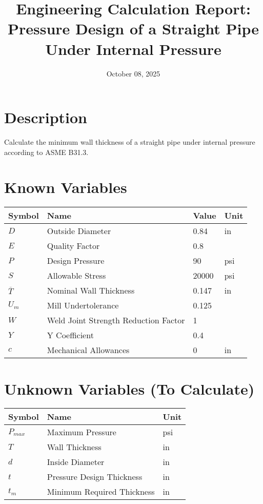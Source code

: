 \documentclass[11pt,a4paper]{article}
\title{Engineering Calculation Report: Pressure Design of a Straight Pipe Under Internal Pressure}
\date{October 08, 2025}
\begin{document}
\maketitle

\section*{Description}
Calculate the minimum wall thickness of a straight pipe under internal pressure according to ASME B31.3.

\section{Known Variables}

\begin{longtable}{llll}
\toprule
Symbol & Name & Value & Unit \\
\midrule
\endhead
$D$ & Outside Diameter & 0.84 & in \\
$E$ & Quality Factor & 0.8 &  \\
$P$ & Design Pressure & 90 & psi \\
$S$ & Allowable Stress & 20000 & psi \\
$\overline{T}$ & Nominal Wall Thickness & 0.147 & in \\
$U_{m}$ & Mill Undertolerance & 0.125 &  \\
$W$ & Weld Joint Strength Reduction Factor & 1 &  \\
$Y$ & Y Coefficient & 0.4 &  \\
$c$ & Mechanical Allowances & 0 & in \\
\bottomrule
\end{longtable}

\section{Unknown Variables (To Calculate)}

\begin{longtable}{lll}
\toprule
Symbol & Name & Unit \\
\midrule
\endhead
$P_{max}$ & Maximum Pressure & psi \\
$T$ & Wall Thickness & in \\
$d$ & Inside Diameter & in \\
$t$ & Pressure Design Thickness & in \\
$t_{m}$ & Minimum Required Thickness & in \\
\bottomrule
\end{longtable}
\end{document}
